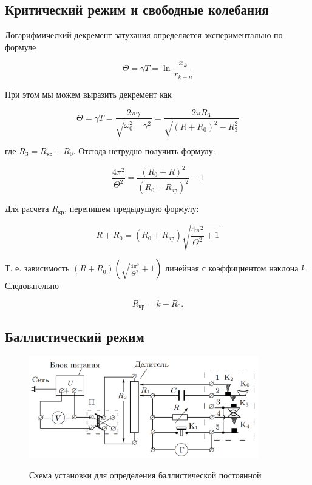 \documentclass[12pt,a4paper]{article}
\begin{document}
	
	\subsection*{Критический режим и свободные колебания}
	
	Логарифмический декремент затухания определяется экспериментально по формуле
	
	\begin{equation}\label{Theta}
	\Theta =  \gamma T =  \ln \dfrac{x_k}{x_{k+n}}
	\end{equation}
	
	При этом мы можем выразить декремент как
	
	\begin{equation}\label{}
		\Theta =  \gamma T =  \dfrac{2\pi\gamma}{\sqrt{\omega_0^2 - \gamma^2}} = \dfrac{2\pi R_3}{\sqrt{(R + R_0)^2 - R_3^2}}
	\end{equation}
	
	где $ R_3 = R_\text{кр} + R_0 $. Отсюда нетрудно получить формулу: 
	
	\begin{equation}\label{}
	\dfrac{4\pi^2}{\Theta^2} = \dfrac{(R_0 + R)^2}{(R_0 + R_\text{кр})^2} - 1
	\end{equation}
	
	Для расчета $ R_\text{кр} $, перепишем предыдущую формулу:
	
	\begin{equation}\label{Rkr}
	R + R_0 = (R_0 + R_\text{кр})\sqrt{\frac{4\pi^2}{\Theta^2} + 1}
	\end{equation}
	
	Т. е. зависимость $(R+R_0)\left(\sqrt{\frac{4\pi^2}{\Theta^2} + 1}\right)$ линейная с коэффициентом наклона $k$. Следовательно 
	
	\begin{equation}\label{Rkr}
	    R_\text{кр} = k - R_0.
	\end{equation}
	 
	 
	 \subsection*{Баллистический режим}
	 
    \begin{figure}[h!]
    	\centering
    	\includegraphics[width=10cm]{res/scheme2.png}
    	\label{fig:s2}
    	\caption{Схема установки для определения баллистической постоянной}
    \end{figure}
\end{document}
